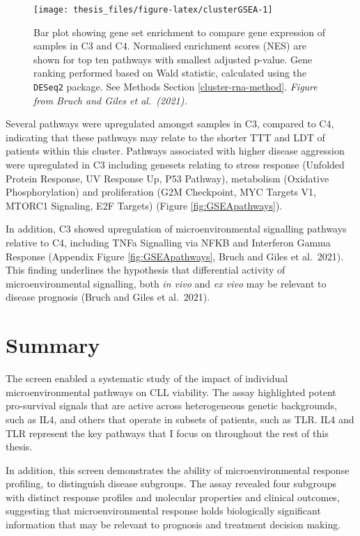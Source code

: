 \documentclass[11pt, a4paper, twosided]{book}
\begin{document}
\begin{figure}[h]

{\centering \texttt{[image: thesis\_files/figure-latex/clusterGSEA-1]} 

}

\caption{Bar plot showing gene set enrichment to compare gene expression of samples in C3 and C4. Normalised enrichment scores (NES) are shown for top ten pathways with smallest adjusted p-value. Gene ranking performed based on Wald statistic, calculated using the \texttt{DESeq2} package. See Methods Section \ref{cluster-rna-method}. \emph{Figure from Bruch and Giles et al.~(2021). }}\label{fig:clusterGSEA}
\end{figure}
Several pathways were upregulated amongst samples in C3, compared to C4, indicating that these pathways may relate to the shorter TTT and LDT of patients within this cluster. Pathways associated with higher disease aggression were upregulated in C3 including genesets relating to stress response (Unfolded Protein Response, UV Response Up, P53 Pathway), metabolism (Oxidative Phosphorylation) and proliferation (G2M Checkpoint, MYC Targets V1, MTORC1 Signaling, E2F Targets) (Figure \ref{fig:GSEApathways}).

In addition, C3 showed upregulation of microenvironmental signalling pathways relative to C4, including TNFa Signalling via NFKB and Interferon Gamma Response (Appendix Figure \ref{fig:GSEApathways}, Bruch and Giles et al.~2021). This finding underlines the hypothesis that differential activity of microenvironmental signalling, both \emph{in vivo} and \emph{ex vivo} may be relevant to disease prognosis (Bruch and Giles et al.~2021).

\hypertarget{summary}{%
\section{Summary}\label{summary}}

The screen enabled a systematic study of the impact of individual microenvironmental pathways on CLL viability. The assay highlighted potent pro-survival signals that are active across heterogeneous genetic backgrounds, such as IL4, and others that operate in subsets of patients, such as TLR. IL4 and TLR represent the key pathways that I focus on throughout the rest of this thesis.

In addition, this screen demonstrates the ability of microenvironmental response profiling, to distinguish disease subgroups. The assay revealed four subgroups with distinct response profiles and molecular properties and clinical outcomes, suggesting that microenvironmental response holds biologically significant information that may be relevant to prognosis and treatment decision making.
\end{document}
